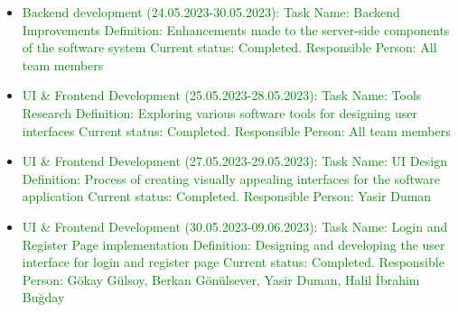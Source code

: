 \documentclass[conference]{IEEEtran}
\begin{document}
\begin{itemize}
    \item \textcolor{green} {Backend development (24.05.2023-30.05.2023):\newline\newline
  Task Name: Backend Improvements\newline
  Definition: Enhancements made to the server-side components of the software system\newline
  Current status: Completed.\newline 
  Responsible Person: All team members\newline
}



  
    \item \textcolor{green} {UI & Frontend Development (25.05.2023-28.05.2023):\newline\newline
  Task Name: Tools Research\newline
  Definition: Exploring various software tools for designing user interfaces\newline
  Current status: Completed.\newline 
  Responsible Person: All team members\newline
}


    \item \textcolor{green} {UI & Frontend Development (27.05.2023-29.05.2023):\newline\newline
  Task Name: UI Design\newline
  Definition: Process of creating visually appealing interfaces for the software application \newline
  Current status: Completed.\newline 
  Responsible Person: Yasir Duman\newline
}


      \item \textcolor{green} {UI & Frontend Development (30.05.2023-09.06.2023):\newline\newline
  Task Name: Login and Register Page implementation\newline
  Definition: Designing and developing the user interface for login and register page \newline
  Current status: Completed.\newline 
  Responsible Person: Gökay Gülsoy, Berkan Gönülsever, Yasir Duman, Halil İbrahim Buğday\newline
}


\end{itemize}
\end{document}
